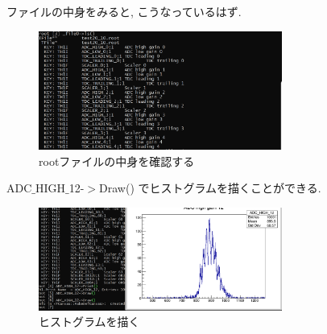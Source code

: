 ファイルの中身をみると, こうなっているはず.

\begin{figure}[h]
  \begin{center}
    \includegraphics[width=8cm]{SummerChallenge_ls_list.png}
    \caption{rootファイルの中身を確認する}
    \label{fig:ls_ROOT}
  \end{center}
\end{figure}

ADC$\_$HIGH$\_$12-$>$Draw() でヒストグラムを描くことができる.

\begin{figure}[h]
  \begin{center}
    \includegraphics[width=8cm]{SummerChallenge_draw_adc12.png}
    \caption{ヒストグラムを描く}
    \label{fig:ls_ROOT}
  \end{center}
\end{figure}

